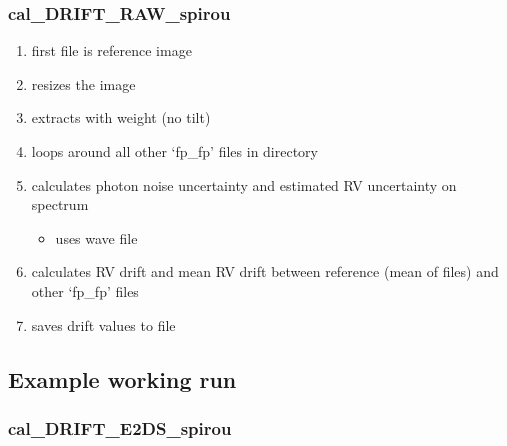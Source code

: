 \subsubsection{cal\_DRIFT\_RAW\_spirou}
\begin{enumerate}
	\item first file is reference image
	\item resizes the image
	\item extracts with weight (no tilt)
	\item loops around all other `fp\_fp' files in directory
	\item calculates photon noise uncertainty and estimated RV uncertainty on spectrum
	\begin{itemize}
		\item uses wave file
	\end{itemize}
	\item calculates RV drift and mean RV drift between reference (mean of files) and other `fp\_fp' files
	\item saves drift values to file
\end{enumerate}


\subsection{Example working run}

\subsubsection{cal\_DRIFT\_E2DS\_spirou}


